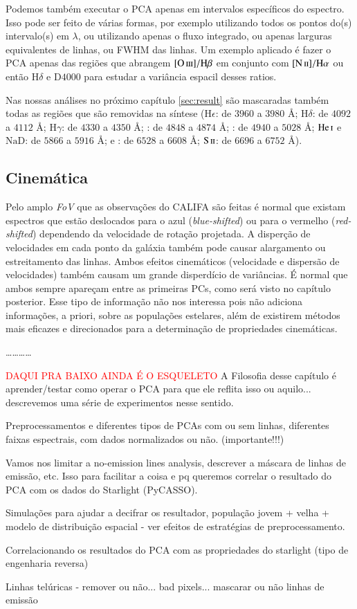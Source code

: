 Podemos também executar o PCA apenas em intervalos específicos do espectro. Isso pode ser feito de várias formas, por
exemplo utilizando todos os pontos do(s) intervalo(s) em $\lambda$, ou utilizando apenas o fluxo integrado, ou apenas
larguras equivalentes de linhas, ou FWHM das linhas. Um exemplo aplicado é fazer o PCA apenas das regiões que abrangem
$\oIII/\Hbeta$ em conjunto com $\nII/\Halpha$ ou então $\mathrm{H}\delta$ e D$4000$ para estudar a variância espacil
desses ratios.

Nas nossas análises no próximo capítulo \ref{sec:result} são mascaradas também todas as regiões que são removidas na
síntese ($\mathrm{H}\epsilon$: de $3960$ a $3980$ \AA; $\mathrm{H}\delta$: de $4092$ a $4112$ \AA; $\mathrm{H}\gamma$:
de $4330$ a $4350$ \AA; \Hbeta: de $4848$ a $4874$ \AA; \oIII: de $4940$ a $5028$ \AA; $\mathrm{He\,\textsc{i}}$ e
$\mathrm{NaD}$: de $5866$ a $5916$ \AA; \Halpha e \nII: de $6528$ a $6608$ \AA; $\mathrm{S\,\textsc{ii}}$: de $6696$ a
$6752$ \AA).

\subsection{Cinemática}
\label{sec:UsoPCA:PCAlidades:cinem}

Pelo amplo {\em FoV} que as observações do CALIFA são feitas é normal que existam espectros que estão deslocados para o
azul ({\em blue-shifted}) ou para o vermelho ({\em red-shifted}) dependendo da velocidade de rotação projetada. A
disperção de velocidades em cada ponto da galáxia também pode causar alargamento ou estreitamento das linhas. Ambos
efeitos cinemáticos (velocidade e dispersão de velocidades) também causam um grande disperdício de variâncias. É normal
que ambos sempre apareçam entre as primeiras PCs, como será visto no capítulo posterior. Esse tipo de informação não nos
interessa pois não adiciona informações, a priori, sobre as populações estelares, além de existirem métodos mais
eficazes e direcionados para a determinação de propriedades cinemáticas.

\ldots \dots \ldots \ldots

\textcolor{red}{DAQUI PRA BAIXO AINDA É O ESQUELETO}
\ojo A Filosofia desse capítulo é aprender/testar como operar o PCA para que ele
reflita isso ou aquilo... descrevemos uma série de experimentos nesse sentido.

Preprocessamentos e diferentes tipos de PCAs com ou sem linhas, diferentes
faixas espectrais, com dados normalizados ou não. (importante!!!)

Vamos nos limitar a no-emission lines analysis, descrever a máscara de linhas de
emissão, etc. Isso para facilitar a coisa e pq queremos correlar o resultado do
PCA com os dados do Starlight (PyCASSO).

Simulações para ajudar a decifrar os resultador, população jovem + velha +
modelo de distribuição espacial - ver efeitos de estratégias de
preprocessamento.

Correlacionando os resultados do PCA com as propriedades do starlight (tipo de
engenharia reversa)

Linhas telúricas - remover ou não... bad pixels... mascarar ou não linhas de
emissão